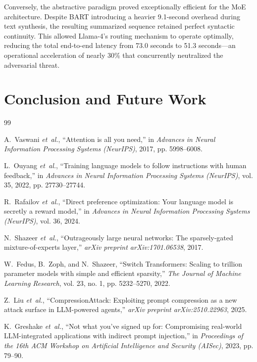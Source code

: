 \documentclass[conference]{IEEEtran}
\begin{document}
Conversely, the abstractive paradigm proved exceptionally efficient for the MoE architecture. Despite BART introducing a heavier 9.1-second overhead during text synthesis, the resulting summarized sequence retained perfect syntactic continuity. This allowed Llama-4's routing mechanism to operate optimally, reducing the total end-to-end latency from 73.0 seconds to 51.3 seconds—an operational acceleration of nearly 30\% that concurrently neutralized the adversarial threat.

\section{Conclusion and Future Work}


\begin{thebibliography}{99}

A.~Vaswani \emph{et~al.}, ``Attention is all you need,'' in \emph{Advances in Neural Information Processing Systems (NeurIPS)}, 2017, pp. 5998--6008.

L.~Ouyang \emph{et~al.}, ``Training language models to follow instructions with human feedback,'' in \emph{Advances in Neural Information Processing Systems (NeurIPS)}, vol. 35, 2022, pp. 27730--27744.

R.~Rafailov \emph{et~al.}, ``Direct preference optimization: Your language model is secretly a reward model,'' in \emph{Advances in Neural Information Processing Systems (NeurIPS)}, vol. 36, 2024.

N.~Shazeer \emph{et~al.}, ``Outrageously large neural networks: The sparsely-gated mixture-of-experts layer,'' \emph{arXiv preprint arXiv:1701.06538}, 2017.

W.~Fedus, B.~Zoph, and N.~Shazeer, ``Switch Transformers: Scaling to trillion parameter models with simple and efficient sparsity,'' \emph{The Journal of Machine Learning Research}, vol. 23, no. 1, pp. 5232--5270, 2022.

Z.~Liu \emph{et~al.}, ``CompressionAttack: Exploiting prompt compression as a new attack surface in LLM-powered agents,'' \emph{arXiv preprint arXiv:2510.22963}, 2025.

K.~Greshake \emph{et~al.}, ``Not what you've signed up for: Compromising real-world LLM-integrated applications with indirect prompt injection,'' in \emph{Proceedings of the 16th ACM Workshop on Artificial Intelligence and Security (AISec)}, 2023, pp. 79--90.


\end{thebibliography}
\end{document}
